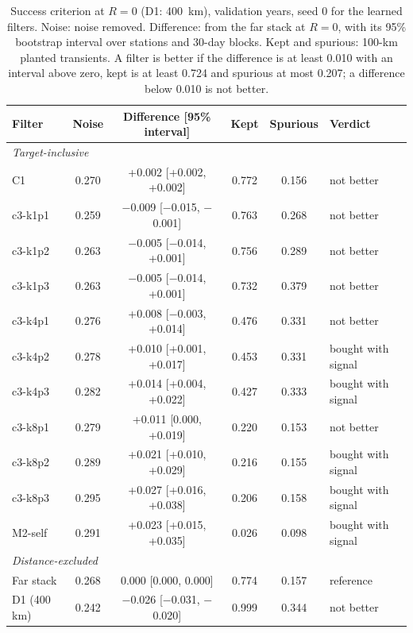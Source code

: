 \documentclass[preprint,12pt,authoryear]{elsarticle}
\begin{document}
\begin{table}[tbp]
  \centering
  \scriptsize\renewcommand{\arraystretch}{0.95}
  \caption{Success criterion at $R = 0$ (D1: 400~km), validation years, seed 0 for the learned filters. Noise: noise removed. Difference: from the far stack at $R = 0$, with its 95\% bootstrap interval over stations and 30-day blocks. Kept and spurious: 100-km planted transients. A filter is better if the difference is at least 0.010 with an interval above zero, kept is at least 0.724 and spurious at most 0.207; a difference below 0.010 is not better.}
  \label{tab:criterion}
  \setlength{\tabcolsep}{4pt}
  \begin{tabular}{lccccl}
    \toprule
    Filter & Noise & Difference [95\% interval] & Kept & Spurious & Verdict \\
    \midrule
    \multicolumn{6}{l}{\textit{Target-inclusive}} \\
    C1 & 0.270 & +0.002 [+0.002, +0.002] & 0.772 & 0.156 & not better \\
    c3-k1p1 & 0.259 & $-$0.009 [$-$0.015, $-$0.001] & 0.763 & 0.268 & not better \\
    c3-k1p2 & 0.263 & $-$0.005 [$-$0.014, +0.001] & 0.756 & 0.289 & not better \\
    c3-k1p3 & 0.263 & $-$0.005 [$-$0.014, +0.001] & 0.732 & 0.379 & not better \\
    c3-k4p1 & 0.276 & +0.008 [$-$0.003, +0.014] & 0.476 & 0.331 & not better \\
    c3-k4p2 & 0.278 & +0.010 [+0.001, +0.017] & 0.453 & 0.331 & bought with signal \\
    c3-k4p3 & 0.282 & +0.014 [+0.004, +0.022] & 0.427 & 0.333 & bought with signal \\
    c3-k8p1 & 0.279 & +0.011 [0.000, +0.019] & 0.220 & 0.153 & not better \\
    c3-k8p2 & 0.289 & +0.021 [+0.010, +0.029] & 0.216 & 0.155 & bought with signal \\
    c3-k8p3 & 0.295 & +0.027 [+0.016, +0.038] & 0.206 & 0.158 & bought with signal \\
    M2-self & 0.291 & +0.023 [+0.015, +0.035] & 0.026 & 0.098 & bought with signal \\
    \multicolumn{6}{l}{\textit{Distance-excluded}} \\
    Far stack & 0.268 & 0.000 [0.000, 0.000] & 0.774 & 0.157 & reference \\
    D1 (400 km) & 0.242 & $-$0.026 [$-$0.031, $-$0.020] & 0.999 & 0.344 & not better \\

\end{tabular}
\end{table}
\end{document}
